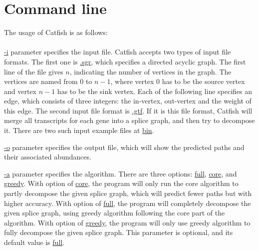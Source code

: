 \documentclass[letter,11pt]{article}
\begin{document}
\section{Command line}
The usage of Catfish is as follows:\\
\\

\url{-i} parameter specifies the input file.
Catfish accepts two types of input file formats. The first one is \url{.sgr},
which specifies a directed acyclic graph. The first line of the file gives
$n$, indicating the number of vertices in the graph. The vertices 
are named from $0$ to $n - 1$, where vertex 0 has to be the source vertex
and vertex $n - 1$ has to be the sink vertex. 
Each of the following line specifies an edge, which consists of three integers:
the in-vertex, out-vertex and the weight of this edge. The second input file format
is \url{.gtf}. If it is this file format, Catfish will merge all transcripts
for each gene into a splice graph, and then try to decompose it.
There are two such input example files at \url{bin}.

\url{-o} parameter specifies the output file, which will show the predicted paths
and their associated abundances.

\url{-a} parameter specifies the algorithm.
There are three options: \url{full}, \url{core}, and \url{greedy}.
With option of \url{core}, the program will only run the core algorithm to partly
decompose the given splice graph, which will predict fewer paths but with
higher accuracy. With option of \url{full}, the program will completely
decompose the given splice graph, using greedy algorithm following the core part of the algorithm.
With option of \url{greedy}, the program will only use greedy algorithm to fully decompose
the given splice graph. This parameter is optional, and its default value is \url{full}.
\end{document}
